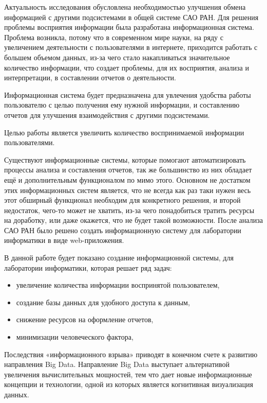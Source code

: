 Актуальность исследования обусловлена необходимостью улучшения обмена информацией с другими подсистемами в общей системе САО РАН. Для решения проблемы восприятия информации была разработана информационная система. Проблема возникла, потому что в современном мире науки, на ряду с увеличением деятельности с пользователями в интернете, приходится работать с большем объемом данных, из-за чего стало накапливаться значительное количество информации, что создает проблемы, для их восприятия, анализа и интерпретации, в составлении отчетов о деятельности. 

Информационная система будет предназначена для увлечения удобства работы пользователю с целью получения ему нужной информации, и составлению отчетов для улучшения взаимодействия с другими подсистемами.

Целью работы является увеличить количество воспринимаемой информации пользователями. 

Существуют информационные системы, которые помогают автоматизировать процессы анализа и составления отчетов, так же большинство из них обладает ещё и дополнительным функционалом по мимо этого. Основном не достатком этих информационных систем является, что не всегда как раз таки нужен весь этот обширный функционал необходим для конкретного решения, и второй недостаток, чего-то может не хватить, из-за чего понадобиться тратить ресурсы на доработку, или даже окажется, что не будет такой возможности. После анализа САО РАН было решено создать информационную систему для лаборатории информатики в виде web-приложения.

В данной работе будет показано создание информационной системы, для лаборатории информатики, которая решает ряд задач:
\begin{itemize}
	\item увеличение количества информации воспринятой пользователем,
	\item создание базы данных для удобного доступа к данным,
	\item снижение ресурсов на оформление отчетов,
	\item минимизации человеческого фактора, 
\end{itemize}




Последствия «информационного взрыва» приводят в конечном счете к развитию направления Big Data. Направление Big Data выступает альтернативой увеличения вычислительных мощностей, тем что дает новые информационные концепции и технологии, одной из которых является когнитивная визуализация данных.


